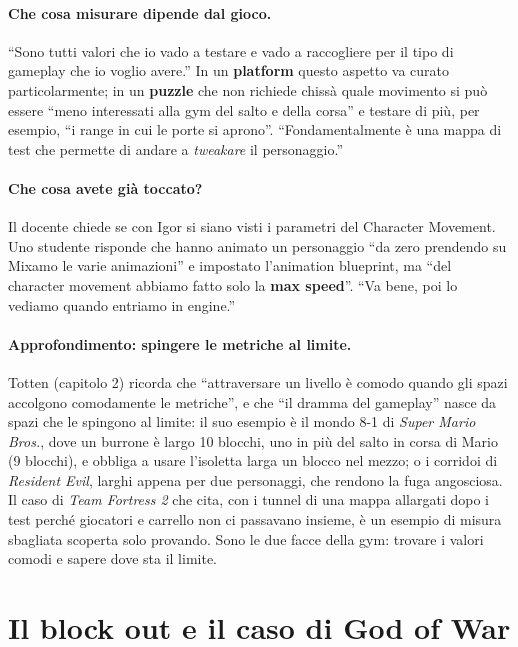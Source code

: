 \paragraph{Che cosa misurare dipende dal gioco.} ``Sono tutti valori che io vado a testare e
vado a raccogliere per il tipo di gameplay che io voglio avere.'' In un \textbf{platform}
questo aspetto va curato particolarmente; in un \textbf{puzzle} che non richiede chissà
quale movimento si può essere ``meno interessati alla gym del salto e della corsa'' e
testare di più, per esempio, ``i range in cui le porte si aprono''. ``Fondamentalmente è
una mappa di test che permette di andare a \emph{tweakare} il personaggio.''

\paragraph{Che cosa avete già toccato?} Il docente chiede se con Igor si siano visti i
parametri del Character Movement. Uno studente risponde che hanno animato un personaggio
``da zero prendendo su Mixamo le varie animazioni'' e impostato l'animation blueprint, ma
``del character movement abbiamo fatto solo la \textbf{max speed}''. ``Va bene, poi lo
vediamo quando entriamo in engine.''

\paragraph{Approfondimento: spingere le metriche al limite.} Totten (capitolo 2) ricorda
che ``attraversare un livello è comodo quando gli spazi accolgono comodamente le
metriche'', e che ``il dramma del gameplay'' nasce da spazi che le spingono al limite: il
suo esempio è il mondo 8-1 di \emph{Super Mario Bros.}, dove un burrone è largo 10
blocchi, uno in più del salto in corsa di Mario (9 blocchi), e obbliga a usare l'isoletta
larga un blocco nel mezzo; o i corridoi di \emph{Resident Evil}, larghi appena per due
personaggi, che rendono la fuga angosciosa. Il caso di \emph{Team Fortress 2} che cita,
con i tunnel di una mappa allargati dopo i test perché giocatori e carrello non ci
passavano insieme, è un esempio di misura sbagliata scoperta solo provando. Sono le due
facce della gym: trovare i valori comodi e sapere dove sta il limite.

\section{Il block out e il caso di God of War}
\label{ue13:sec:blockout}

